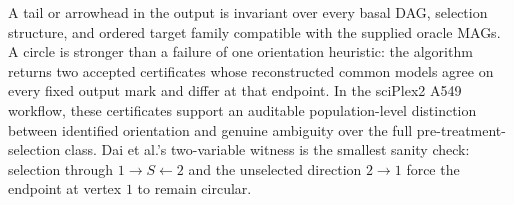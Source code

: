 A tail or arrowhead in the output is invariant over every basal DAG, selection structure, and ordered target family compatible with the supplied oracle MAGs.  A circle is stronger than a failure of one orientation heuristic: the algorithm returns two accepted certificates whose reconstructed common models agree on every fixed output mark and differ at that endpoint.  In the sciPlex2 A549 workflow, these certificates support an auditable population-level distinction between identified orientation and genuine ambiguity over the full pre-treatment-selection class.  Dai et al.'s two-variable witness is the smallest sanity check: selection through \(1\to S\leftarrow2\) and the unselected direction \(2\to1\) force the endpoint at vertex \(1\) to remain circular.